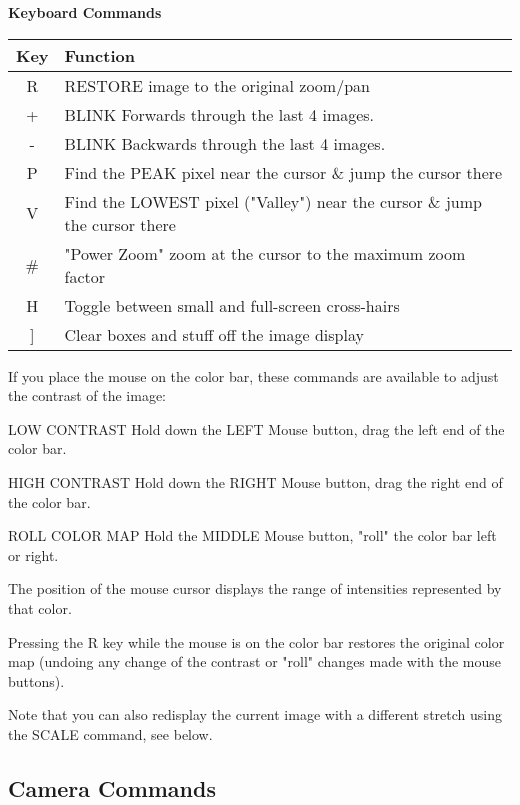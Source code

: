 \documentclass[10pt]{report}
\newenvironment{example}{
        \begin{list}{}{
                \labelsep=0.25in
                \labelwidth=2.0in
                \leftmargin=2.75in
                \itemindent=0in
                \itemsep=0in
                \parsep=0in
        }
}{
        \end{list}
}
\begin{document}
\begin{center}
{\bf Keyboard Commands}\\
\begin{tabular}{cl}
\hline
Key & Function\\
\hline
 R &RESTORE image to the original zoom/pan\\
 + &BLINK Forwards through the last 4 images.\\
 - &BLINK Backwards through the last 4 images.\\
 P &Find the PEAK pixel near the cursor \& jump the cursor there\\
 V &Find the LOWEST pixel ("Valley") near the cursor \& jump the cursor there\\
 \# &"Power Zoom" zoom at the cursor to the maximum zoom factor\\
 H &Toggle between small and full-screen cross-hairs\\
 ] &Clear boxes and stuff off the image display\\
\hline
\end{tabular}
\end{center}


If you place the mouse on the color bar, these commands are available
to adjust the contrast of the image:
\begin{example}
  \item[LOW CONTRAST]{Hold down the LEFT Mouse button, drag the left
       end of the color bar.}

  \item[HIGH CONTRAST]{Hold down the RIGHT Mouse button, drag the right
       end of the color bar.}

  \item[ROLL COLOR MAP]{Hold the MIDDLE Mouse button, "roll" the
       color bar left or right.}
\end{example}
The position of the mouse cursor displays the range of intensities
represented by that color.

Pressing the R key while the mouse is on the color bar restores the
original color map (undoing any change of the contrast or "roll" changes
made with the mouse buttons).

Note that you can also redisplay the current image with a different
stretch using the SCALE command, see below. 

\subsection{Camera Commands}
\end{document}
